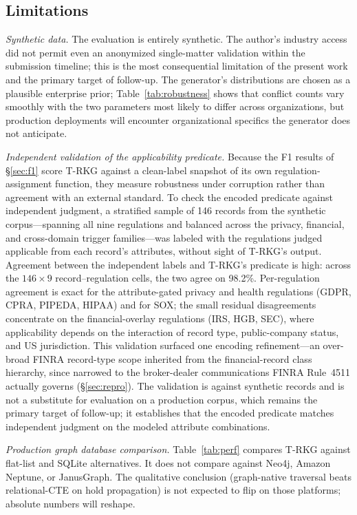 \documentclass{ieeeaccess}
\begin{document}
\subsection{Limitations}

\textit{Synthetic data.} The evaluation is entirely synthetic. The author's industry access did not permit even an anonymized single-matter validation within the submission timeline; this is the most consequential limitation of the present work and the primary target of follow-up. The generator's distributions are chosen as a plausible enterprise prior; Table~\ref{tab:robustness} shows that conflict counts vary smoothly with the two parameters most likely to differ across organizations, but production deployments will encounter organizational specifics the generator does not anticipate.

\textit{Independent validation of the applicability predicate.}
\label{sec:expert}
Because the F1 results of §\ref{sec:f1} score T-RKG against a clean-label snapshot of its own regulation-assignment function, they measure robustness under corruption rather than agreement with an external standard. To check the encoded predicate against independent judgment, a stratified sample of 146 records from the synthetic corpus---spanning all nine regulations and balanced across the privacy, financial, and cross-domain trigger families---was labeled with the regulations judged applicable from each record's attributes, without sight of T-RKG's output. Agreement between the independent labels and T-RKG's predicate is high: across the $146 \times 9$ record--regulation cells, the two agree on 98.2\%. Per-regulation agreement is exact for the attribute-gated privacy and health regulations (GDPR, CPRA, PIPEDA, HIPAA) and for SOX; the small residual disagreements concentrate on the financial-overlay regulations (IRS, HGB, SEC), where applicability depends on the interaction of record type, public-company status, and US jurisdiction. This validation surfaced one encoding refinement---an over-broad FINRA record-type scope inherited from the financial-record class hierarchy, since narrowed to the broker-dealer communications FINRA Rule~4511 actually governs (§\ref{sec:repro}). The validation is against synthetic records and is not a substitute for evaluation on a production corpus, which remains the primary target of follow-up; it establishes that the encoded predicate matches independent judgment on the modeled attribute combinations.

\textit{Production graph database comparison.} Table~\ref{tab:perf} compares T-RKG against flat-list and SQLite alternatives. It does not compare against Neo4j, Amazon Neptune, or JanusGraph. The qualitative conclusion (graph-native traversal beats relational-CTE on hold propagation) is not expected to flip on those platforms; absolute numbers will reshape.
\end{document}
